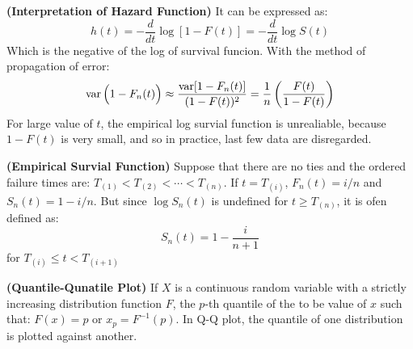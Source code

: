 \begin{remark}{\textbf{(Interpretation of Hazard Function)}}
    It can be expressed as:
    \begin{equation*}
        h(t) = -\frac{d}{dt}\log[1-F(t)] = -\frac{d}{dt} \log S(t)
    \end{equation*}
    Which is the negative of the log of survival funcion. With the method of propagation of error:
    \begin{equation*}
        \operatorname{var}\Big( 1 - F_n(t) \Big) \approx \frac{\operatorname{var}[1-F_n(t)]}{(1-F(t))^2} = \frac{1}{n}\left( \frac{F(t)}{1-F(t)} \right)
    \end{equation*}
    For large value of $t$, the empirical log survial function is unrealiable, because $1-F(t)$ is very small, and so in practice, last few data are disregarded.
\end{remark}

\begin{remark}{\textbf{(Empirical Survial Function)}}    
    Suppose that there are no ties and the ordered failure times are: $T_{(1)} < T_{(2)} < \cdots < T_{(n)}$. If $t = T_{(i)}$, $F_n(t) = i/n$ and $S_{n}(t) = 1-i/n$. But since $\log S_n(t)$ is undefined for $t\ge T_{(n)}$, it is ofen defined as:
    \begin{equation*}
        S_n(t) = 1 - \frac{i}{n+1}
    \end{equation*}
    for $T_{(i)} \le t < T_{(i+1)}$
\end{remark}

\begin{definition}{\textbf{(Quantile-Qunatile Plot)}}
    If $X$ is a continuous random variable with a strictly increasing distribution function $F$, the $p$-th quantile of the to be value of $x$ such that: $F(x) = p$ or $x_p = F^{-1}(p)$. In Q-Q plot, the quantile of one distribution is plotted against another. 
\end{definition}

